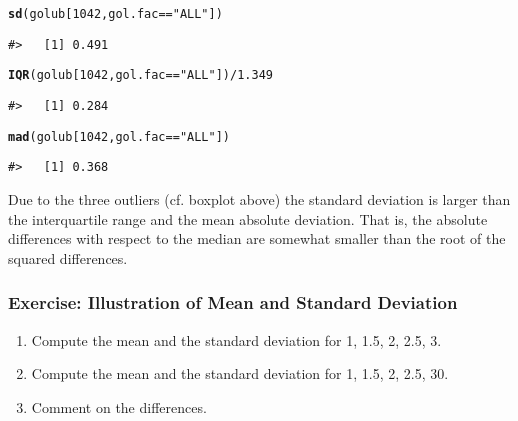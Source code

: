 \documentclass{article}\usepackage[]{graphicx}\usepackage[usenames,dvipsnames]{color}
\makeatletter
\newcommand{\hlnum}[1]{\textcolor[rgb]{0.686,0.059,0.569}{#1}}%
\newcommand{\hlstr}[1]{\textcolor[rgb]{0.192,0.494,0.8}{#1}}%
\newcommand{\hlopt}[1]{\textcolor[rgb]{0,0,0}{#1}}%
\newcommand{\hlstd}[1]{\textcolor[rgb]{0.345,0.345,0.345}{#1}}%
\newcommand{\hlkwd}[1]{\textcolor[rgb]{0.737,0.353,0.396}{\textbf{#1}}}%
\newenvironment{kframe}{%
 \def\at@end@of@kframe{}%
 \ifinner\ifhmode%
  \def\at@end@of@kframe{\end{minipage}}%
  \begin{minipage}{\columnwidth}%
 \fi\fi%
 \def\FrameCommand##1{\hskip\@totalleftmargin \hskip-\fboxsep
 \colorbox{shadecolor}{##1}\hskip-\fboxsep
     \hskip-\linewidth \hskip-\@totalleftmargin \hskip\columnwidth}%
 \MakeFramed {\advance\hsize-\width
   \@totalleftmargin\z@ \linewidth\hsize
   \@setminipage}}%
 {\par\unskip\endMakeFramed%
 \at@end@of@kframe}
\newenvironment{knitrout}{}{} %
\makeatother
\begin{document}
\begin{knitrout}
\color{fgcolor}\begin{kframe}
\begin{alltt}
\hlkwd{sd}\hlstd{(golub[}\hlnum{1042}\hlstd{, gol.fac}\hlopt{==}\hlstr{"ALL"}\hlstd{])}
\end{alltt}
\begin{verbatim}
#>   [1] 0.491
\end{verbatim}
\begin{alltt}
\hlkwd{IQR}\hlstd{(golub[}\hlnum{1042}\hlstd{, gol.fac}\hlopt{==}\hlstr{"ALL"}\hlstd{])} \hlopt{/} \hlnum{1.349}
\end{alltt}
\begin{verbatim}
#>   [1] 0.284
\end{verbatim}
\begin{alltt}
\hlkwd{mad}\hlstd{(golub[}\hlnum{1042}\hlstd{, gol.fac}\hlopt{==}\hlstr{"ALL"}\hlstd{])}
\end{alltt}
\begin{verbatim}
#>   [1] 0.368
\end{verbatim}
\end{kframe}
\end{knitrout}

Due to the three outliers (cf. boxplot above) the standard deviation is larger
than the interquartile range and the mean absolute deviation. That is, the
absolute differences with respect to the median are somewhat smaller than
the root of the squared differences.

\subsubsection*{Exercise: Illustration of Mean and Standard Deviation}


\begin{enumerate}[label=(\emph{\alph*})]
 \item Compute the mean and the standard deviation for 1, 1.5, 2, 2.5, 3.
\item Compute the mean and the standard deviation for 1, 1.5, 2, 2.5, 30.
 \item Comment on the differences.
\end{enumerate}
\end{document}
